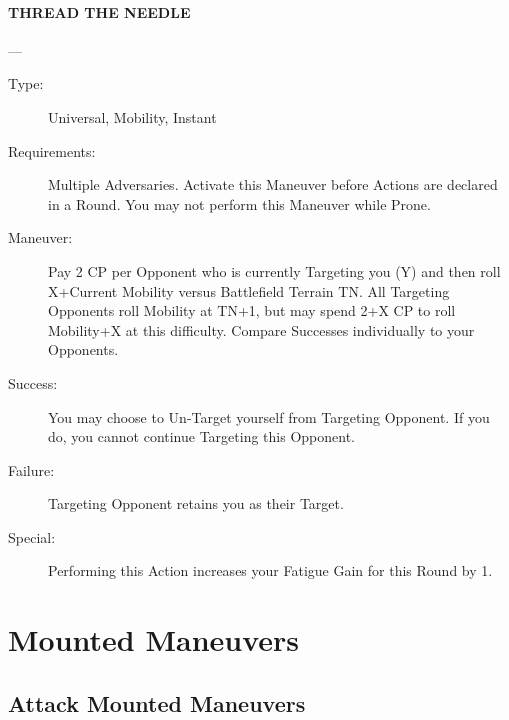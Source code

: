 \documentclass[oneside,11pt,english]{book}
\begin{document}
\paragraph{\large\label{man:THREAD THE NEEDLE} THREAD THE NEEDLE}---
\vspace{-10pt}\begin{description} 
\item [Type:] Universal, Mobility, Instant 
\item [Requirements:] Multiple Adversaries. Activate this Maneuver before Actions are declared in a Round. 
You may not perform this Maneuver while Prone. 
\item [Maneuver:] Pay 2 CP per Opponent who is currently Targeting you (Y) and then roll X+Current Mobility 
versus Battlefield Terrain TN. All Targeting Opponents roll Mobility at TN+1, but may spend 2+X CP to 
roll Mobility+X at this difficulty. Compare Successes individually to your Opponents. 
\item [Success:] You may choose to Un-Target yourself from Targeting Opponent. If you do, you cannot 
continue Targeting this Opponent. 
\item [Failure:] Targeting Opponent retains you as their Target. 
\item [Special:] Performing this Action increases your Fatigue Gain for this Round by 1. 
\end{description}
\section{Mounted Maneuvers}
\subsection{Attack Mounted Maneuvers}
\end{document}
